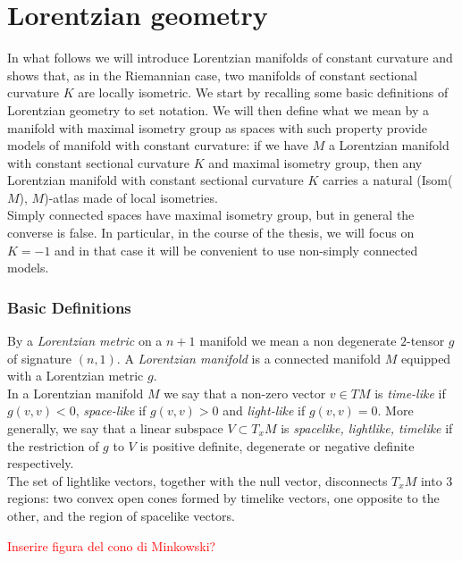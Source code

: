 \chapter{Lorentzian geometry}

In what follows we will introduce Lorentzian manifolds of constant curvature and shows that, as in the Riemannian case, two manifolds of constant sectional curvature $K$ are locally isometric. We start by recalling some basic definitions of Lorentzian geometry to set notation. We will then define what we mean by a manifold with maximal isometry group as spaces with such property provide models of manifold with constant curvature: if we have $M$ a Lorentzian manifold with constant sectional curvature $K$ and maximal isometry group, then any Lorentzian manifold with constant sectional curvature $K$ carries a natural (Isom($M$), $M$)-atlas made of local isometries. \\
Simply connected spaces have maximal isometry group, but in general the converse is false. In particular, in the course of the thesis, we will focus on $K=-1$ and in that case it will be convenient to use non-simply connected models. 

\subsection{Basic Definitions}
By a \textit{Lorentzian metric} on a $n+1$ manifold we mean a non degenerate $2$-tensor $g$ of signature $(n,1)$. A \textit{Lorentzian manifold} is a connected manifold $M$ equipped with a Lorentzian metric $g$.\\
In a Lorentzian manifold $M$ we say that a non-zero vector $v \in TM$ is \textit{time-like} if $g(v,v)<0$, \textit{space-like} if $g(v,v)>0$ and \textit{light-like} if $g(v,v)=0$. More generally, we say that a linear subspace $V \subset T_{x}M$ is \textit{spacelike, lightlike, timelike} if the restriction of $g$ to $V$ is positive definite, degenerate or negative definite respectively.\\
The set of lightlike vectors, together with the null vector, disconnects $T_{x}M$ into 3 regions: two convex open cones formed by timelike vectors, one opposite to the other, and the region of spacelike vectors. 

\textcolor{red}{Inserire figura del cono di Minkowski?}

